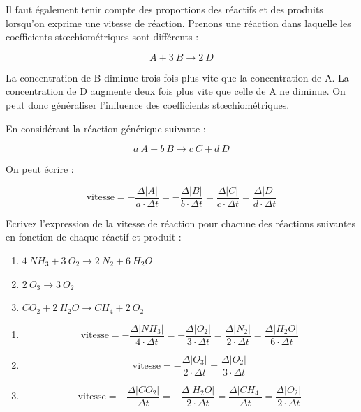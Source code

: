 \documentclass[
  11pt,
  a4paper,
  openany]{book}
\providecommand{\tightlist}{%
  \setlength{\itemsep}{0pt}\setlength{\parskip}{0pt}}
\begin{document}
Il faut également tenir compte des proportions des réactifs et des produits lorsqu'on exprime une vitesse de réaction. Prenons une réaction dans laquelle les coefficients stœchiométriques sont différents :

\[
A + 3\ B \rightarrow 2\ D
\]

La concentration de B diminue trois fois plus vite que la concentration de A. La concentration de D augmente deux fois plus vite que celle de A ne diminue. On peut donc généraliser l'influence des coefficients stœchiométriques.

\newpage

En considérant la réaction générique suivante :

\[
a\ A + b\ B \rightarrow c\ C + d\ D
\]

On peut écrire :

\[
\text{vitesse} = - \frac{\Delta |A|}{a \cdot \Delta t} = - \frac{\Delta |B|}{b \cdot \Delta t} = \frac{\Delta |C|}{c \cdot \Delta t} = \frac{\Delta |D|}{d \cdot \Delta t}
\]

\begin{Exercise}

Ecrivez l'expression de la vitesse de réaction pour chacune des réactions suivantes en fonction de chaque réactif et produit :

\begin{enumerate}
\def\labelenumi{\arabic{enumi}.}
\tightlist
\item
  \(4\ NH_3 + 3\ O_2 \rightarrow 2\ N_2 + 6\ H_2O\)
\item
  \(2\ O_3 \rightarrow 3\ O_2\)
\item
  \(CO_2 + 2\ H_2O \rightarrow CH_4 + 2\ O_2\)
\end{enumerate}

\end{Exercise}

\begin{Answer}

\begin{enumerate}
\def\labelenumi{\arabic{enumi}.}
\item
  \[
  \text{vitesse} = - \frac{\Delta |NH_3|}{4 \cdot \Delta t} = - \frac{\Delta |O_2|}{3 \cdot \Delta t} = \frac{\Delta |N_2|}{2 \cdot \Delta t} = \frac{\Delta |H_2O|}{6 \cdot \Delta t}
  \]
\item
  \[
  \text{vitesse} = - \frac{\Delta |O_3|}{2 \cdot \Delta t} = \frac{\Delta |O_2|}{3 \cdot \Delta t}
  \]
\item
  \[
  \text{vitesse} = - \frac{\Delta |CO_2|}{\Delta t} = - \frac{\Delta |H_2O|}{2 \cdot \Delta t} = \frac{\Delta |CH_4|}{\Delta t} = \frac{\Delta |O_2|}{2 \cdot \Delta t}
  \]
\end{enumerate}

\end{Answer}
\end{document}
